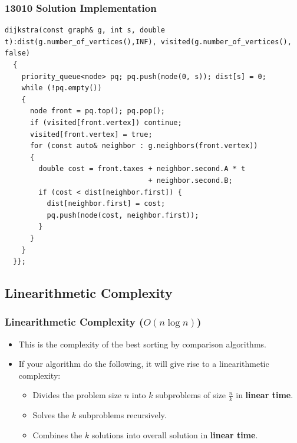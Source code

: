 \documentclass{beamer}
\begin{document}
\begin{frame}[containsverbatim]
\frametitle{13010 Solution Implementation}
\scriptsize

\begin{lstlisting}[mathescape]
  dijkstra(const graph& g, int s, double t):dist(g.number_of_vertices(),INF), visited(g.number_of_vertices(), false)
  {
    priority_queue<node> pq; pq.push(node(0, s)); dist[s] = 0;
    while (!pq.empty())
    {
      node front = pq.top(); pq.pop();
      if (visited[front.vertex]) continue;
      visited[front.vertex] = true;
      for (const auto& neighbor : g.neighbors(front.vertex))
      {
        double cost = front.taxes + neighbor.second.A * t
                                  + neighbor.second.B;
        if (cost < dist[neighbor.first]) {
          dist[neighbor.first] = cost;
          pq.push(node(cost, neighbor.first));
        }
      }
    }
  }};
\end{lstlisting}

\end{frame}

\fi

\subsection{Linearithmetic Complexity}

\begin{frame}%
\frametitle{Linearithmetic Complexity ($O(n \log n)$)}

\begin{itemize}

\item This is the complexity of the best sorting by comparison algorithms.

\vspace{0.4cm}

\item<2-> If your algorithm do the following, it will give rise to a linearithmetic complexity:
\vspace{0.2cm}
\begin{itemize}
\item<3-> Divides the problem size $n$ into $k$ subproblems of size $\frac{n}{k}$ in \textbf{linear time}.
\vspace{0.2cm}
\item<4-> Solves the $k$ subproblems recursively.
\vspace{0.2cm}
\item<5-> Combines the $k$ solutions into overall solution in \textbf{linear time}.
\end{itemize}

\end{itemize}

\end{frame}
\end{document}

